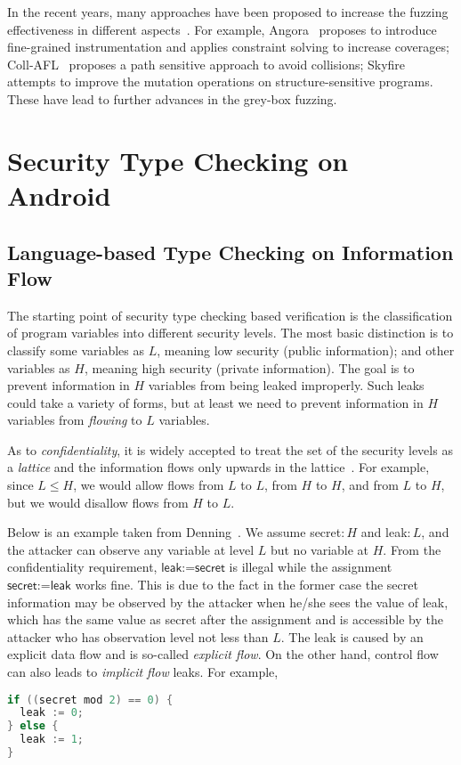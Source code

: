 In the recent years, many approaches have been proposed to increase the fuzzing effectiveness in different aspects~\cite{Bohme:2016:CGF,LiCMLLT17,Bohme:2017:DGF,FairFuzz,CollAFL,Angora,nezha,fuzz_survey}. For example, Angora~\cite{Angora} proposes to introduce fine-grained instrumentation and applies constraint solving to increase coverages; Coll-AFL~\cite{CollAFL} proposes a path sensitive approach to avoid collisions; Skyfire~\cite{junjie:2017sp:skyfire} attempts to improve the mutation operations on structure-sensitive programs. These have lead to further advances in the grey-box fuzzing.

\section{Security Type Checking on Android}\label{sec:intro-sta}

\subsection{Language-based Type Checking on Information Flow}

The starting point of security type checking based verification is the classification of program variables into different security levels. The most basic distinction is to classify some variables as $L$, meaning low security (public information); and other variables as $H$, meaning high security (private information). The goal is to prevent information in $H$ variables from being leaked improperly. Such leaks could take a variety of forms, but at least we need to prevent information in $H$ variables from \emph{flowing} to $L$ variables.

As to \emph{confidentiality}, it is widely accepted to treat the set of the security levels as a  \emph{lattice} and the information flows only upwards in the lattice~\cite{Denning:1977hwa}. For example, since $L\leq H$, we would allow flows from $L$ to $L$, from $H$ to $H$, and from $L$ to $H$, but we would disallow flows from $H$ to $L$.

Below is an example taken from Denning~\cite{Denning:1976cl}. We assume \textsf{secret}$:H$ and \textsf{leak}$:L$, and the attacker can observe any variable at level $L$ but no variable at $H$.
From the confidentiality requirement, $\textsf{leak:=secret}$ is illegal while the assignment $\textsf{secret:=leak}$ works fine. This is due to the fact in the former case the secret information may be observed by the attacker when he/she sees the value of \textsf{leak}, which has the same value as \textsf{secret} after the assignment and is accessible by the attacker who has observation level not less than $L$. The leak is caused by an explicit data flow and is so-called \emph{explicit flow}. On the other hand, control flow can also leads to \emph{implicit flow} leaks. For example,
\begin{lstlisting}[language=c,float=h]
if ((secret mod 2) == 0) {
  leak := 0;
} else {
  leak := 1;	
}  
\end{lstlisting}

